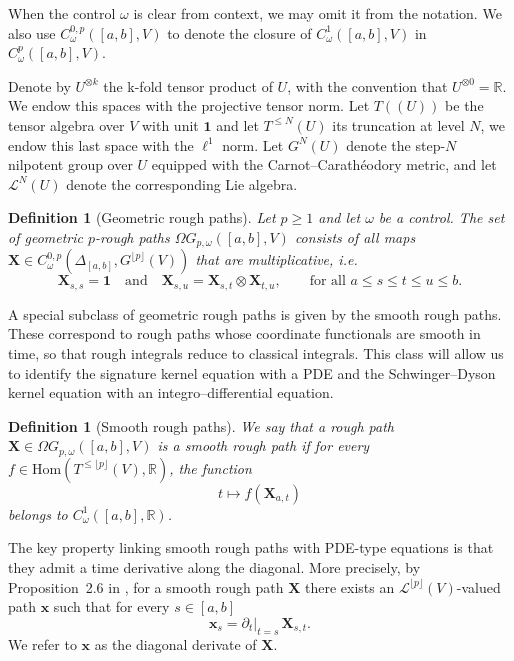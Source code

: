 \documentclass{article}%
\newtheorem{definition}[theorem]{Definition}
\begin{document}
When the control $\omega$ is clear from context, we may omit it from the notation. We also use $C^{0,p}_\omega([a,b],V)$ to denote the closure of $C^1_\omega([a,b],V)$ in $C^p_\omega([a,b],V)$.\newline  

Denote by $U^{\otimes k}$ the 
k-fold tensor product of 
$U$, with the convention that $U^{\otimes 0} = \mathbb{R}$. We endow this spaces with the projective tensor norm.
Let $T((U))$ be the tensor algebra over $V$ with unit $\mathbf{1}$ and let $T^{\leq N}(U)$ its truncation at level $N$, we endow this last space with the $\ell^1$ norm. Let $G^N(U)$ denote the step-$N$ nilpotent group over $U$ equipped with the Carnot–Carathéodory metric, and let $\mathcal{L}^N(U)$ denote the corresponding Lie algebra.

\begin{definition}[Geometric rough paths]
Let $p\ge 1$ and let $\omega$ be a control. The set of geometric $p$-rough paths
$\Omega G_{p,\omega}([a,b],V)$ consists of all maps
\(
\mathbf{X}\in C^{0,p}_\omega\!\left(\Delta_{[a,b]},G^{\lfloor p\rfloor}(V)\right)
\)
that are multiplicative, i.e.
\[
\mathbf{X}_{s,s}=\mathbf{1}
\quad\text{and}\quad
\mathbf{X}_{s,u}=\mathbf{X}_{s,t}\otimes \mathbf{X}_{t,u},
\qquad \text{for all } a\le s\le t\le u\le b.
\]
\end{definition}

A special subclass of geometric rough paths is given by the smooth rough paths. 
These correspond to rough paths whose coordinate functionals are smooth in time, 
so that rough integrals reduce to classical integrals. This class will allow us 
to identify the signature kernel equation with a PDE and the Schwinger–Dyson 
kernel equation with an integro–differential equation.

\begin{definition}[Smooth rough paths]
We say that a rough path $\mathbf{X} \in \Omega G_{p,\omega}
([a,b],V)$ is a smooth rough path if for every
$f \in \mathrm{Hom}(T^{\le \lfloor p \rfloor}(V), \mathbb{R})$, the function
\[
t \mapsto f(\mathbf{X}_{a,t})
\]
belongs to $C^{1}_{\omega}([a,b], \mathbb{R})$.
\end{definition}

The key property linking smooth rough paths with PDE-type equations is that they admit a time derivative along the diagonal. More precisely, by Proposition~2.6 in \cite{bellingeri2022smooth}, for a smooth rough path $\mathbf{X}$ there exists an $\mathcal{L}^{\lfloor p \rfloor}(V)$-valued path $\boldsymbol{x}$ such that for every $s \in [a,b]$
\[
\boldsymbol{x}_s = \partial_t\big|_{t=s}\, \mathbf{X}_{s,t}.
\]
We refer to $\boldsymbol{x}$ as the diagonal derivate of $\mathbf{X}$.
\end{document}
